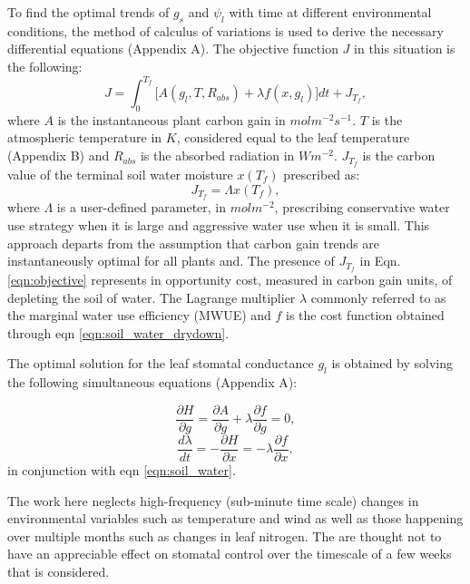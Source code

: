 \documentclass[utf8]{frontiersSCNS} %
\begin{document}
To find the optimal trends of $g_s$ and $\psi_l$ with time at different environmental conditions, the method of calculus of variations is used to derive the necessary differential equations (Appendix A). The objective function $J$ in this situation is the following:
\begin{equation}
    \label{eqn:objective}
    J = \int_0^{T_f}\big[ A(g_l,T,R_{abs}) + \lambda f(x,g_l)\big] dt + J_{T_f},
\end{equation}
where $A$ is the instantaneous plant carbon gain in $molm^{-2}s^{-1}$. $T$ is the atmospheric temperature in $K$, considered equal to the leaf temperature (Appendix B) and $R_{abs}$ is the absorbed radiation in $Wm^{-2}$. $J_{T_f}$ is the carbon value of the terminal soil water moisture $x(T_f)$ prescribed as:
\begin{equation}
    \label{eqn:terminal_gain}
    J_{T_f} = \Lambda x(T_f),
\end{equation}
where $\Lambda$ is a user-defined parameter, in $mol m^{-2}$, prescribing conservative water use strategy when it is large and aggressive water use when it is small. This approach departs from the assumption that carbon gain trends are instantaneously optimal for all plants and. The presence of $J_{T_f}$ in Eqn. \ref{eqn:objective} represents in opportunity cost, measured in carbon gain units, of depleting the soil of water. The Lagrange multiplier $\lambda$ commonly referred to as the marginal water use efficiency (MWUE) and $f$ is the cost function obtained through eqn \ref{eqn:soil_water_drydown}.

The optimal solution for the leaf stomatal conductance $g_l$ is obtained by solving the following simultaneous equations (Appendix A):

\begin{equation}
    \label{eqn: dg}
    \frac{\partial H}{\partial g} = \frac{\partial A}{\partial g} + \lambda \frac{\partial f}{\partial g}=0,
\end{equation}
\begin{equation}
    \label{eqn: dlam}
    \frac{d\lambda}{dt} = - \frac{\partial H}{\partial x} = - \lambda \frac{\partial f}{\partial x},
\end{equation}
in conjunction with eqn \ref{eqn:soil_water}.

The work here neglects high-frequency (sub-minute time scale) changes in environmental variables such as temperature and wind as well as those happening over multiple months such as changes in leaf nitrogen. The are thought not to have an appreciable effect on stomatal control over the timescale of a few weeks that is considered.
\end{document}
